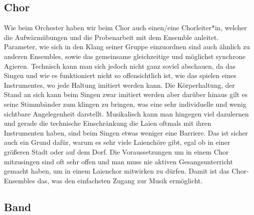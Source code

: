 \subsection{Chor}

Wie beim Orchester haben wir beim Chor auch einen/eine Chorleiter*in, welcher die
Aufwärmübungen und die Probenarbeit mit dem Ensemble anleitet. Parameter, wie
sich in den Klang seiner Gruppe einzuordnen sind auch ähnlich zu anderen
Ensembles, sowie das gemeinsame gleichzeitige und möglichst synchrone Agieren.
Technisch kann man sich jedoch nicht ganz soviel abschauen, da das Singen und
wie es funktioniert nicht so offensichtlich ist, wie das spielen eines
Instrumentes, wo jede Haltung imitiert werden kann. Die Körperhaltung, der Stand
an sich kann beim Singen zwar imitiert werden aber darüber hinaus gilt es seine
Stimmbänder zum klingen zu bringen, was eine sehr individuelle und wenig
sichtbare Angelegenheit darstellt. Musikalisch kann man hingegen viel dazulernen
und gerade die technische Einschränkung die Laien oftmals mit ihren Instrumenten
haben, sind beim Singen etwas weniger eine Barriere. Das ist sicher auch ein
Grund dafür, warum es sehr viele Laienchöre gibt, egal ob in einer größeren
Stadt oder auf dem Dorf. Die Voraussetzungen um in einem Chor mitzusingen sind
oft sehr offen und man muss nie aktiven Gesangsunterricht gemacht haben, um in
einem Laienchor mitwirken zu dürfen. Damit ist das Chor-Ensembles das, was den
einfachsten Zugang zur Musik ermöglicht. 



\subsection{Band}

